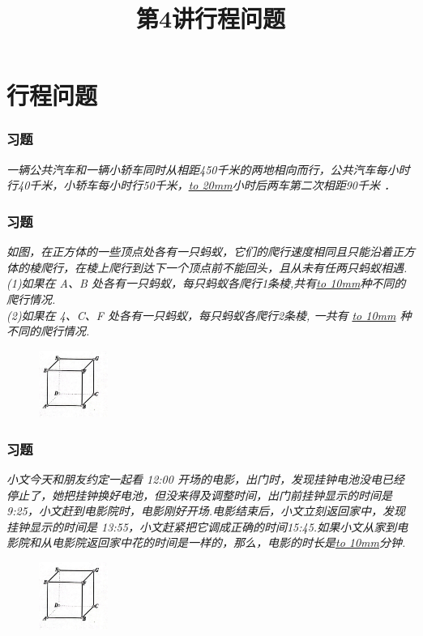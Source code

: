 \section{行程问题}

\title[第4讲\quad 行程问题]{第4讲\quad 行程问题} 
\author{}
\date{}

\begin{frame}
    \titlepage
\end{frame}

\setcounter{framecounter}{0}

\begin{frame}
    \frametitle{习题\theframecounter}
    \textit{一辆公共汽车和一辆小轿车同时从相距450千米的两地相向而行，公共汽车每小时行40千米，小轿车每小时行50千米，\underline{\hbox to 20mm{}}小时后两车第二次相距90千米 ．} 
\end{frame}

\begin{frame}
    \frametitle{习题\theframecounter}
    \textit{如图，在正方体的一些顶点处各有一只蚂蚁，它们的爬行速度相同且只能沿着正方体的棱爬行，在棱上爬行到达下一个顶点前不能回头，且从未有任两只蚂蚁相遇.\\
    (1)如果在 A、B 处各有一只蚂蚁，每只蚂蚁各爬行1条棱,共有\underline{\hbox to 10mm{}}种不同的爬行情况.\\
    (2)如果在 4、C、F 处各有一只蚂蚁，每只蚂蚁各爬行2条棱, 
    一共有 \underline{\hbox to 10mm{}} 种不同的爬行情况.
    }
    \begin{figure}[H] 
        \centering
        \includegraphics[width=0.2\textwidth]{./pics/Chapter_4/2.png}
    \end{figure}
\end{frame}

\begin{frame}
    \frametitle{习题\theframecounter}
    \textit{小文今天和朋友约定一起看 12:00 开场的电影，出门时，发现挂钟电池没电已经停止了，她把挂钟换好电池，但没来得及调整时间，出门前挂钟显示的时间是 9:25，小文赶到电影院时，电影刚好开场.电影结束后，小文立刻返回家中，发现挂钟显示的时间是 13:55，小文赶紧把它调成正确的时间15:45.如果小文从家到电影院和从电影院返回家中花的时间是一样的，那么，电影的时长是\underline{\hbox to 10mm{}}分钟.}
    \begin{figure}[H] 
        \centering
        \includegraphics[width=0.2\textwidth]{./pics/Chapter_4/2.png}
    \end{figure}
\end{frame}


